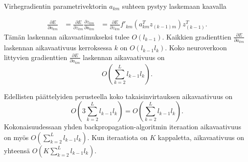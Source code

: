 \documentclass[11pt]{article}
\begin{document}
 Virhegradientin parametrivektorin $a_{km}$ suhteen pystyy laskemaan kaavalla 

\begin{equation*}
\begin{aligned}
\frac{\partial E}{\partial a_{km}} &= \frac{\partial E}{\partial z_{km}}\frac{\partial z_{km}}{\partial a_{km}}
 &= \frac{\partial E}{\partial z_{km}} f'_{km}(a_{km}^Tz_{(k - 1)m})z_{(k - 1)}^T.
\end{aligned}
\end{equation*}
Tämän laskennan aikavaatimukseksi tulee $O(l_{k - 1})$. Kaikkien gradienttien $\frac{\partial E}{\partial a_{km}}$ laskennan aikavaativuus kerroksessa $k$ on $O(l_{k - 1} l_k)$. Koko neuroverkoon littyvien gradienttien $\frac{\partial E}{\partial a_{km}}$  laskennan aikavaativuus on
\begin{equation*}
O(\sum_{k = 2}^{L} l_{k - 1} l_{k}).
\end{equation*}

Edellisten päättelyiden perusteella koko takaisinvirtauksen aikavaativuus on 
\begin{equation*}
O(3 \sum_{k = 2}^{L} l_{k - 1} l_{k}) = O(\sum_{k = 2}^{L} l_{k - 1} l_{k}).
\end{equation*}
Kokonaisuudessaan yhden backpropagation-algoritmin iteraation aikavaativuus on myös $O(\sum_{k = 2}^{L} l_{k - 1} l_{k})$. Kun iteraatiota on $K$ kappaletta, aikavaativuus on yhteensä $O(K\sum_{k = 2}^{L} l_{k - 1} l_{k})$.
\end{document}
